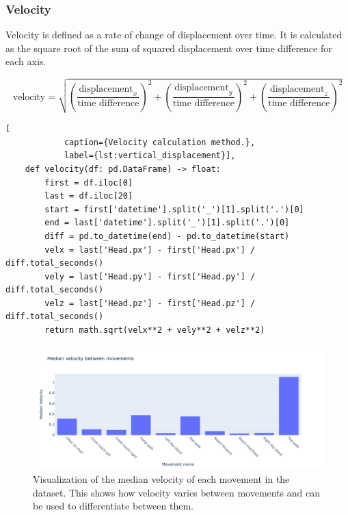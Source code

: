             \subsubsection{Velocity}
                
                Velocity is defined as a rate of change of displacement over time. It is calculated as the square root of the sum of squared displacement over time difference for each axis. 

                \begin{equation}\label{eq:velocity}
                    \text{velocity} = \sqrt{\left(\frac{\text{displacement}_x}{\text{time difference}}\right)^2 + \left(\frac{\text{displacement}_y}{\text{time difference}}\right)^2 + \left(\frac{\text{displacement}_z}{\text{time difference}}\right)^2}
                \end{equation}

                               
        \begin{lstlisting}[
            caption={Velocity calculation method.}, 
            label={lst:vertical_displacement}],     
    def velocity(df: pd.DataFrame) -> float:
        first = df.iloc[0]
        last = df.iloc[20]
        start = first['datetime'].split('_')[1].split('.')[0]
        end = last['datetime'].split('_')[1].split('.')[0]
        diff = pd.to_datetime(end) - pd.to_datetime(start)
        velx = last['Head.px'] - first['Head.px'] / diff.total_seconds()
        vely = last['Head.py'] - first['Head.py'] / diff.total_seconds()
        velz = last['Head.pz'] - first['Head.pz'] / diff.total_seconds()
        return math.sqrt(velx**2 + vely**2 + velz**2)
        \end{lstlisting}

                \begin{figure}[H]
                    \centering
                    \includegraphics[width=1.0\textwidth]{../src/resources/plots/feat-eng/median_velocity.png}
                    \caption{
                       Visualization of the median velocity of each movement in the dataset. This shows how velocity varies between movements and can be used to differentiate between them.
                    }
                    \label{fig:velocity}
                \end{figure}

